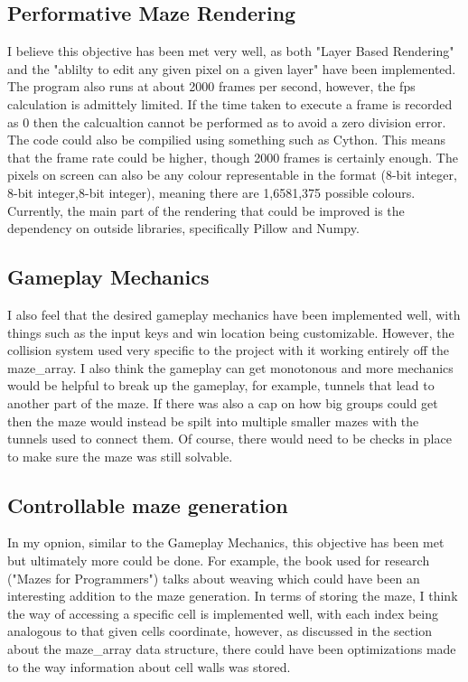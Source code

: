 \documentclass{article}
\begin{document}
\subsection{Performative Maze Rendering}
I believe this objective has been met very well, as both "Layer Based Rendering" and the "ablilty to edit any given pixel on a given layer" have been implemented. The program also runs
at about 2000 frames per second, however, the fps calculation is admittely limited. If the time taken to execute a frame is recorded as 0 then the calcualtion cannot be performed as to avoid
a zero division error. The code could also be compilied using something such as Cython. This means that the frame rate could be higher, though 2000 frames is certainly enough. The pixels on screen can also be any colour representable in the format (8-bit integer, 8-bit integer,8-bit integer), meaning there are 1,6581,375 possible colours. Currently, the main part of the rendering that could be improved is the dependency on outside libraries,
specifically Pillow and Numpy.

\subsection{Gameplay Mechanics}
I also feel that the desired gameplay mechanics have been implemented well, with things such as the input keys and win location being customizable. However, the collision system used 
very specific to the project with it working entirely off the maze\_array. I also think the gameplay can get monotonous and more mechanics would be helpful to break up the gameplay, for
example, tunnels that lead to another part of the maze. If there was also a cap on how big groups could get then the maze would instead be spilt into multiple smaller mazes with the tunnels
used to connect them. Of course, there would need to be checks in place to make sure the maze was still solvable.

\subsection{Controllable maze generation}
In my opnion, similar to the Gameplay Mechanics, this objective has been met but ultimately more could be done. For example, the book used for research ("Mazes for Programmers") talks 
about weaving which could have been an interesting addition to the maze generation. In terms of storing the maze, I think the way of accessing a specific cell is implemented well, with each index
being analogous to that given cells coordinate, however, as discussed in the section about the maze\_array data structure, there could have been optimizations made to the way information
about cell walls was stored.
\end{document}
